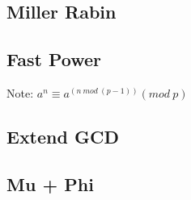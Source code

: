 \documentclass[a4paper,10pt,twocolumn,oneside]{article}
\begin{document}
\subsection{Miller Rabin}


\subsection{Fast Power}
{ \normalsize
Note: $a^n \equiv a^{(n \ mod \ (p-1))} (mod \ p)$
}

\subsection{Extend GCD}


\subsection{Mu + Phi}

\end{document}
